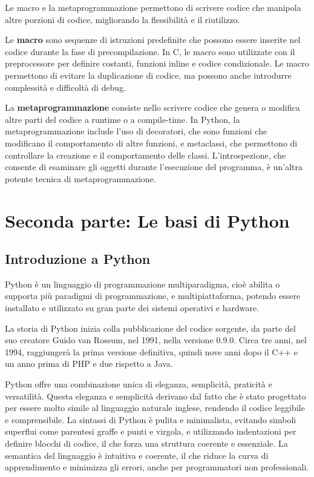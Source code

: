 \documentclass[
  letterpaper,
]{scrbook}
\begin{document}
Le macro e la metaprogrammazione permettono di scrivere codice che
manipola altre porzioni di codice, migliorando la flessibilità e il
riutilizzo.

Le \textbf{macro} sono sequenze di istruzioni predefinite che possono
essere inserite nel codice durante la fase di precompilazione. In C, le
macro sono utilizzate con il preprocessore per definire costanti,
funzioni inline e codice condizionale. Le macro permettono di evitare la
duplicazione di codice, ma possono anche introdurre complessità e
difficoltà di debug.

La \textbf{metaprogrammazione} consiste nello scrivere codice che genera
o modifica altre parti del codice a runtime o a compile-time. In Python,
la metaprogrammazione include l'uso di decoratori, che sono funzioni che
modificano il comportamento di altre funzioni, e metaclassi, che
permettono di controllare la creazione e il comportamento delle classi.
L'introspezione, che consente di esaminare gli oggetti durante
l'esecuzione del programma, è un'altra potente tecnica di
metaprogrammazione.

\part{Seconda parte: Le basi di Python}

\chapter{Introduzione a Python}\label{introduzione-a-python}

Python è un linguaggio di programmazione multiparadigma, cioè abilita o
supporta più paradigmi di programmazione, e multipiattaforma, potendo
essere installato e utilizzato su gran parte dei sistemi operativi e
hardware.

La storia di Python inizia colla pubblicazione del codice sorgente, da
parte del suo creatore Guido van Rossum, nel 1991, nella versione 0.9.0.
Circa tre anni, nel 1994, raggiungerà la prima versione definitiva,
quindi nove anni dopo il C++ e un anno prima di PHP e due rispetto a
Java.

Python offre una combinazione unica di eleganza, semplicità, praticità e
versatilità. Questa eleganza e semplicità derivano dal fatto che è stato
progettato per essere molto simile al linguaggio naturale inglese,
rendendo il codice leggibile e comprensibile. La sintassi di Python è
pulita e minimalista, evitando simboli superflui come parentesi graffe e
punti e virgola, e utilizzando indentazioni per definire blocchi di
codice, il che forza una struttura coerente e essenziale. La semantica
del linguaggio è intuitiva e coerente, il che riduce la curva di
apprendimento e minimizza gli errori, anche per programmatori non
professionali.
\end{document}
